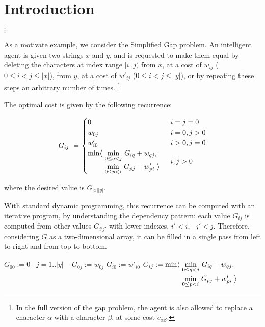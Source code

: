 \section{Introduction}

$\vdots$

As a motivate example, we consider the Simplified Gap problem.
An intelligent agent is given two strings $x$ and $y$, and is requested
to make them equal by deleting the characters at index range $[i..j)$
from $x$, at a cost of $w_{ij}$ ($0\leq i<j\leq |x|$), from $y$,
at a cost of $w'_{ij}$ ($0\leq i<j\leq |y|$), or by repeating these steps
an arbitrary number of times.
\footnote{In the full version of the gap problem, the agent is also allowed to replace a character $\alpha$ with a character $\beta$, at some cost $c_{\alpha\beta}$.}

The optimal cost is given by the following recurrence:

\begin{equation}
\renewcommand\arraystretch{1.5}
\begin{array}{l@{}l}
	G_{ij} ~=~  &
	\begin{cases}
		0                        & i=j=0 \\
		w_{0j}                   & i=0, j>0 \\
		w'_{i0}                  & i>0, j=0 \\
		\begin{array}{@{}l@{~}l}
		  \min\langle & \underset{0\leq q<j}\min ~ G_{iq} + w_{qj}, \\
		              & \underset{0\leq p<i}\min ~ G_{pj} + w'_{pi}~\rangle
		\end{array}              & i,j>0
	\end{cases}
\end{array}
\end{equation}

\smallskip\noindent
where the desired value is $G_{|x||y|}$.

\medskip
With standard dynamic programming, this recurrence can be computed
with an iterative program, by understanding the dependency pattern:
each value $G_{ij}$ is computed from other values $G_{i'j'}$ with lower
indexes, $i'<i$, ~$j'<j$. Therefore, considering $G$ as a two-dimensional
array, it can be filled in a single pass from left to right and from top
to bottom.

\newcommand\FORLINE[1]{\STATE\algorithmicfor~{#1} \algorithmicdo~}

\begin{algorithm}
\renewcommand\arraystretch{1.3}
\begin{algorithmic}
  \STATE $G_{00} := 0$
  \FORLINE{$j=1..|y|$}  $G_{0j} := w_{0j}$  
    \STATE $G_{i0} := w'_{i0}$
      \STATE $G_{ij} :=
        \begin{array}[t]{@{}l@{~}l} 
          \min\langle & \underset{0\leq q<j}\min ~ G_{iq} + w_{qj}, \\
                      & \underset{0\leq p<i}\min ~ G_{pj} + w'_{pi}~\rangle 
        \end{array}$
    \ENDFOR
  \ENDFOR
\end{algorithmic}
\end{algorithm}

